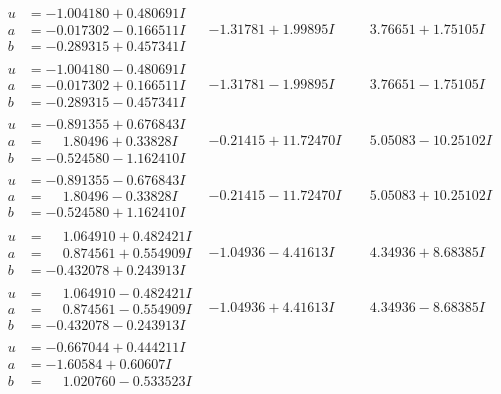 \documentclass[1p]{elsarticle_modified}
\theoremstyle{definition}
\begin{document}
$$\begin{array}{c|c|c}
\begin{aligned}
u &= -1.004180 + 0.480691 I \\
a &= -0.017302 - 0.166511 I \\
b &= -0.289315 + 0.457341 I\end{aligned}
 & -1.31781 + 1.99895 I & \phantom{-}3.76651 + 1.75105 I \\ \hline\begin{aligned}
u &= -1.004180 - 0.480691 I \\
a &= -0.017302 + 0.166511 I \\
b &= -0.289315 - 0.457341 I\end{aligned}
 & -1.31781 - 1.99895 I & \phantom{-}3.76651 - 1.75105 I \\ \hline\begin{aligned}
u &= -0.891355 + 0.676843 I \\
a &= \phantom{-}1.80496 + 0.33828 I \\
b &= -0.524580 - 1.162410 I\end{aligned}
 & -0.21415 + 11.72470 I & \phantom{-}5.05083 - 10.25102 I \\ \hline\begin{aligned}
u &= -0.891355 - 0.676843 I \\
a &= \phantom{-}1.80496 - 0.33828 I \\
b &= -0.524580 + 1.162410 I\end{aligned}
 & -0.21415 - 11.72470 I & \phantom{-}5.05083 + 10.25102 I \\ \hline\begin{aligned}
u &= \phantom{-}1.064910 + 0.482421 I \\
a &= \phantom{-}0.874561 + 0.554909 I \\
b &= -0.432078 + 0.243913 I\end{aligned}
 & -1.04936 - 4.41613 I & \phantom{-}4.34936 + 8.68385 I \\ \hline\begin{aligned}
u &= \phantom{-}1.064910 - 0.482421 I \\
a &= \phantom{-}0.874561 - 0.554909 I \\
b &= -0.432078 - 0.243913 I\end{aligned}
 & -1.04936 + 4.41613 I & \phantom{-}4.34936 - 8.68385 I \\ \hline\begin{aligned}
u &= -0.667044 + 0.444211 I \\
a &= -1.60584 + 0.60607 I \\
b &= \phantom{-}1.020760 - 0.533523 I\end{aligned}

\end{array}$$
\end{document}
